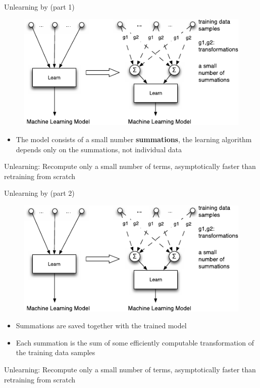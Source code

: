\documentclass[12pt,aspectratio=169,handout]{beamer}
\begin{document}
\begin{frame}{Unlearning by \citet{Cao.Yang.2015.SP} (part 1)}

\begin{figure}
\includegraphics[width=0.4\linewidth]{img/Cao.Yang.Fig1.pdf}
\end{figure}

\begin{itemize}
\item The model consists of a small number \textbf{summations}, the learning algorithm depends only on the summations, not individual data
\end{itemize}

Unlearning: Recompute only a small number of terms, asymptotically faster than retraining from scratch




\end{frame}


\begin{frame}{Unlearning by \citet{Cao.Yang.2015.SP} (part 2)}

\begin{figure}
\includegraphics[width=0.4\linewidth]{img/Cao.Yang.Fig1.pdf}
\end{figure}

\begin{itemize}
\item Summations are saved together with the trained model
\item Each summation is the sum of some efficiently computable transformation of the training data samples
\end{itemize}

Unlearning: Recompute only a small number of terms, asymptotically faster than retraining from scratch




\end{frame}
\end{document}
